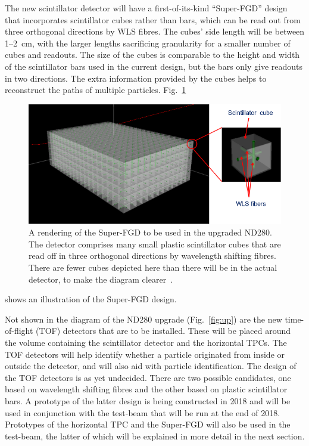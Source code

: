\documentclass[aps,pra,12pt,notitlepage,tightenlines]{revtex4-1}
\begin{document}
The new scintillator detector will have a first-of-its-kind ``Super-FGD'' design that incorporates scintillator cubes rather than bars, which can be read out from three orthogonal directions by WLS fibres. The cubes' side length will be between 1--2~cm, with the larger lengths sacrificing granularity for a smaller number of cubes and readouts. The size of the cubes is comparable to the height and width of the scintillator bars used in the current design, but the bars only give readouts in two directions. The extra information provided by the cubes helps to reconstruct the paths of multiple particles. Fig.~\ref{fig:sfgd}
 \begin{figure}
  \includegraphics[scale=0.75]{SFGD.png}
  \caption{A rendering of the Super-FGD to be used in the upgraded ND280. The detector comprises many small plastic scintillator cubes that are read off in three orthogonal directions by wavelength shifting fibres. There are fewer cubes depicted here than there will be in the actual detector, to make the diagram clearer~\cite{Blondel:2299599}.}
  \label{fig:sfgd}
 \end{figure}
shows an illustration of the Super-FGD design.

Not shown in the diagram of the ND280 upgrade (Fig.\ \ref{fig:up}) are the new time-of-flight (TOF) detectors that are to be installed. These will be placed around the volume containing the scintillator detector and the horizontal TPCs. The TOF detectors will help identify whether a particle originated from inside or outside the detector, and will also aid with particle identification. The design of the TOF detectors is as yet undecided. There are two possible candidates, one based on wavelength shifting fibres and the other based on plastic scintillator bars. A prototype of the latter design is being constructed in 2018 and will be used in conjunction with the test-beam that will be run at the end of 2018. Prototypes of the horizontal TPC and the Super-FGD will also be used in the test-beam, the latter of which will be explained in more detail in the next section.
\end{document}
